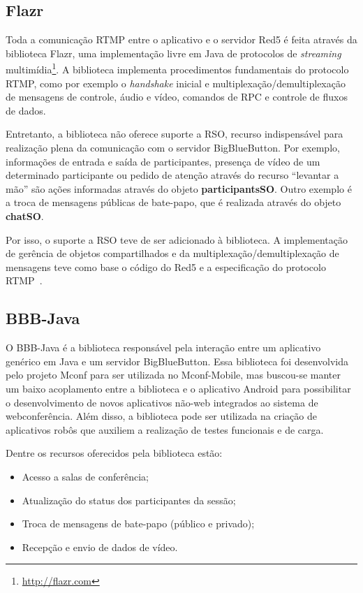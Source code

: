 \documentclass{acm_proc_article-sp}
\begin{document}
\subsection{Flazr}

Toda a comunicação RTMP entre o aplicativo e o servidor Red5 é feita através da biblioteca Flazr, uma implementação livre em Java de protocolos de \emph{streaming} multimídia\footnote{\url{http://flazr.com}}. A biblioteca implementa procedimentos fundamentais do protocolo RTMP, como por exemplo o \emph{handshake} inicial e multiplexação/demultiplexação de mensagens de controle, áudio e vídeo, comandos de RPC e controle de fluxos de dados.

Entretanto, a biblioteca não oferece suporte a RSO, recurso indispensável para realização plena da comunicação com o servidor BigBlueButton. Por exemplo, informações de entrada e saída de participantes, presença de vídeo de um determinado participante ou pedido de atenção através do recurso ``levantar a mão'' são ações informadas através do objeto \textbf{participantsSO}. Outro exemplo é a troca de mensagens públicas de bate-papo, que é realizada através do objeto \textbf{chatSO}. 

Por isso, o suporte a RSO teve de ser adicionado à biblioteca. A implementação de gerência de objetos compartilhados e da multiplexação/demultiplexação de mensagens teve como base o código do Red5 e a especificação do protocolo RTMP~\cite{rtmp}.

\subsection{BBB-Java}

O BBB-Java é a biblioteca responsável pela interação entre um aplicativo genérico em Java e um servidor BigBlueButton. Essa biblioteca foi desenvolvida pelo projeto Mconf para ser utilizada no Mconf-Mobile, mas buscou-se manter um baixo acoplamento entre a biblioteca e o aplicativo Android para possibilitar o desenvolvimento de novos aplicativos não-web integrados ao sistema de webconferência. Além disso, a biblioteca pode ser utilizada na criação de aplicativos robôs que auxiliem a realização de testes funcionais e de carga.

Dentre os recursos oferecidos pela biblioteca estão:
\begin{itemize}
 \item Acesso a salas de conferência;
 \item Atualização do status dos participantes da sessão;
 \item Troca de mensagens de bate-papo (público e privado);
 \item Recepção e envio de dados de vídeo.
\end{itemize}
\end{document}
